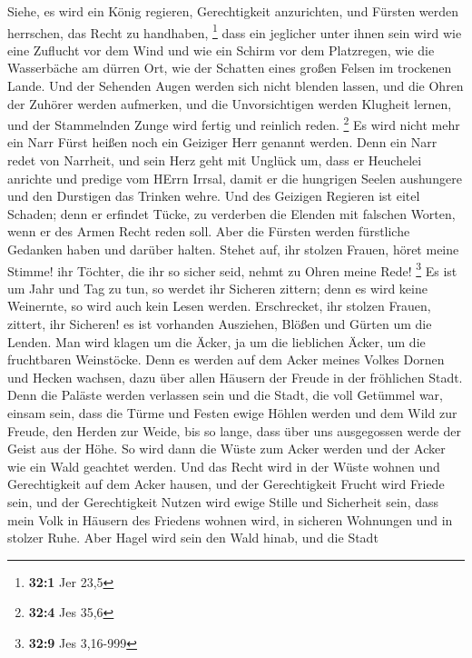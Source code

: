  Siehe, es wird ein König regieren, Gerechtigkeit
anzurichten, und Fürsten werden herrschen, das Recht zu handhaben,
\footnote{\textbf{32:1} Jer 23,5}  dass ein jeglicher unter
ihnen sein wird wie eine Zuflucht vor dem Wind und wie ein Schirm vor
dem Platzregen, wie die Wasserbäche am dürren Ort, wie der Schatten
eines großen Felsen im trockenen Lande.  Und der Sehenden
Augen werden sich nicht blenden lassen, und die Ohren der Zuhörer werden
aufmerken,  und die Unvorsichtigen werden Klugheit lernen,
und der Stammelnden Zunge wird fertig und reinlich reden. \footnote{\textbf{32:4}
  Jes 35,6}  Es wird nicht mehr ein Narr Fürst heißen noch
ein Geiziger Herr genannt werden.  Denn ein Narr redet von
Narrheit, und sein Herz geht mit Unglück um, dass er Heuchelei anrichte
und predige vom HErrn Irrsal, damit er die hungrigen Seelen aushungere
und den Durstigen das Trinken wehre.  Und des Geizigen
Regieren ist eitel Schaden; denn er erfindet Tücke, zu verderben die
Elenden mit falschen Worten, wenn er des Armen Recht reden soll.
 Aber die Fürsten werden fürstliche Gedanken haben und
darüber halten.  Stehet auf, ihr stolzen Frauen, höret meine
Stimme! ihr Töchter, die ihr so sicher seid, nehmt zu Ohren meine Rede!
\footnote{\textbf{32:9} Jes 3,16-999}  Es ist um Jahr und
Tag zu tun, so werdet ihr Sicheren zittern; denn es wird keine
Weinernte, so wird auch kein Lesen werden.  Erschrecket,
ihr stolzen Frauen, zittert, ihr Sicheren! es ist vorhanden Ausziehen,
Blößen und Gürten um die Lenden.  Man wird klagen um die
Äcker, ja um die lieblichen Äcker, um die fruchtbaren Weinstöcke.
 Denn es werden auf dem Acker meines Volkes Dornen und
Hecken wachsen, dazu über allen Häusern der Freude in der fröhlichen
Stadt.  Denn die Paläste werden verlassen sein und die
Stadt, die voll Getümmel war, einsam sein, dass die Türme und Festen
ewige Höhlen werden und dem Wild zur Freude, den Herden zur Weide,
 bis so lange, dass über uns ausgegossen werde der Geist
aus der Höhe. So wird dann die Wüste zum Acker werden und der Acker wie
ein Wald geachtet werden.  Und das Recht wird in der Wüste
wohnen und Gerechtigkeit auf dem Acker hausen,  und der
Gerechtigkeit Frucht wird Friede sein, und der Gerechtigkeit Nutzen wird
ewige Stille und Sicherheit sein,  dass mein Volk in
Häusern des Friedens wohnen wird, in sicheren Wohnungen und in stolzer
Ruhe.  Aber Hagel wird sein den Wald hinab, und die Stadt
